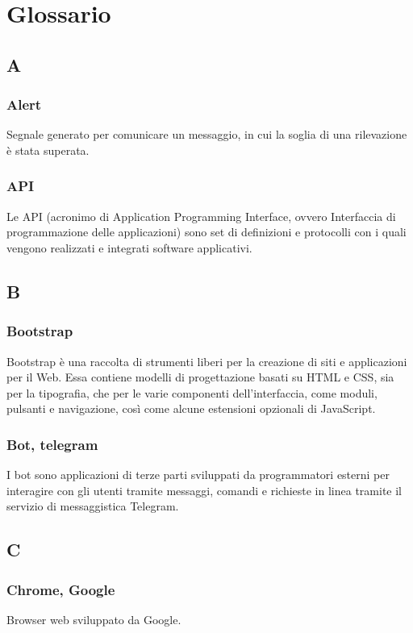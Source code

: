 

\setcounter{secnumdepth}{1} %
\setcounter{tocdepth}{3} %


\section{Glossario}
\subsection{A}
\subsubsection{Alert} Segnale generato per comunicare un messaggio, in cui la soglia di una rilevazione è stata superata.
\subsubsection{API} Le API (acronimo di Application Programming Interface, ovvero Interfaccia di programmazione delle applicazioni) sono set di definizioni e protocolli con i quali vengono realizzati e integrati software applicativi.
\subsection{B}
\subsubsection{Bootstrap}  Bootstrap è una raccolta di strumenti liberi per la creazione di siti e applicazioni per il Web. Essa contiene modelli di progettazione basati su HTML e CSS, sia per la tipografia, che per le varie componenti dell'interfaccia, come moduli, pulsanti e navigazione, così come alcune estensioni opzionali di JavaScript.
\subsubsection{Bot, telegram}  I bot sono applicazioni di terze parti sviluppati da programmatori esterni per interagire con gli utenti tramite messaggi, comandi e richieste in linea tramite il servizio di messaggistica Telegram.
\subsection{C}
\subsubsection{Chrome, Google}
Browser web sviluppato da Google.
